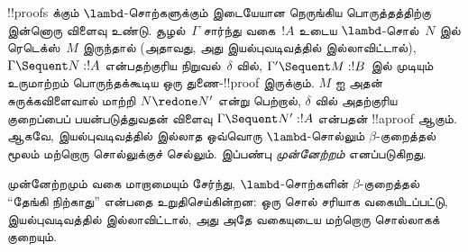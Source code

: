 \documentclass[../../../include/open-logic-section]{subfiles}
\begin{document}
!!{proof}s க்கும் $\lambd$-சொற்களுக்கும் இடையேயான
நெருங்கிய பொருத்தத்திற்கு இன்னொரு விளைவு உண்டு.
சூழல்~$\Gamma$ சார்ந்து வகை~$!A$ உடைய
$\lambd$-சொல்~$N$ இல் ரெடெக்ஸ்~$M$ இருந்தால்
(அதாவது, அது இயல்புவடிவத்தில் இல்லாவிட்டால்),
$\Gamma \Sequent N : !A$ என்பதற்குரிய
 நிறுவல்~$\delta$ வில்,
$\Gamma' \Sequent M: !B$ இல் முடியும்
உருமாற்றம் பொருந்தக்கூடிய ஒரு துணை-!!{proof}
இருக்கும். $M$ ஐ அதன் சுருக்கவிளைவால் மாற்றி
$N \redone N'$ என்று பெற்றால்,
$\delta$ வில் அதற்குரிய குறைப்பைப் பயன்படுத்துவதன்
விளைவு $\Gamma \Sequent N' : !A$ என்பதன்
!!a{proof} ஆகும். ஆகவே, இயல்புவடிவத்தில் இல்லாத
ஒவ்வொரு $\lambd$-சொல்லும் $\beta$-குறைத்தல்
மூலம் மற்றொரு சொல்லுக்குச் செல்லும்.
இப்பண்பு \emph{முன்னேற்றம்} எனப்படுகிறது.

முன்னேற்றமும் வகை மாறாமையும் சேர்ந்து,
$\lambd$-சொற்களின் $\beta$-குறைத்தல்
“தேங்கி நிற்காது” என்பதை உறுதிசெய்கின்றன:
ஒரு சொல் சரியாக வகையிடப்பட்டு,
இயல்புவடிவத்தில் இல்லாவிட்டால்,
அது அதே வகையுடைய மற்றொரு சொல்லாகக் குறையும்.
\end{document}
